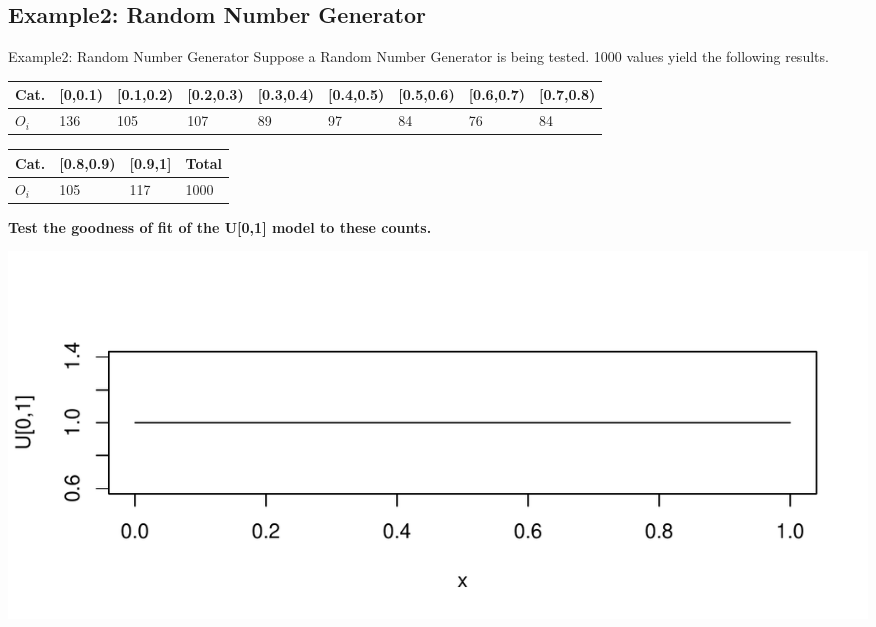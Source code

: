 \documentclass[t,xcolor=pdftex,dvipsnames,table]{beamer}
\makeatletter
\def\maxwidth{ %
  \ifdim\Gin@nat@width>\linewidth
    \linewidth
  \else
    \Gin@nat@width
  \fi
}
\newenvironment{knitrout}{}{} %
\makeatother
\begin{document}
\subsection[GoodnessofFit]{Example2: Random Number Generator}
\begin{frame}[fragile]{Example2: Random Number Generator}
Suppose a Random Number Generator is being tested. 1000 values yield the following results. \\

\vspace{.5cm}
{\tiny 
\begin{tabular}{l|llllllll}  \hline
Cat. & [0,0.1) &  [0.1,0.2) & [0.2,0.3) & [0.3,0.4) & [0.4,0.5) & [0.5,0.6) & [0.6,0.7) & [0.7,0.8)  \\ \hline
$O_{i}$ & 136 & 105 & 107 & 89 & 97 & 84 & 76 & 84    \\ \hline
\end{tabular}
}

\vspace{.5cm}
{\tiny 
\begin{tabular}{l|lll}  \hline
Cat. & [0.8,0.9) &  [0.9,1] & Total \\ \hline
$O_{i}$ & 105  & 117  & 1000      \\ \hline
\end{tabular}
}

\vspace{.5cm}
{\bf Test the goodness of fit of the U[0,1] model to these counts.}

\begin{knitrout}
\color{fgcolor}
\includegraphics[width=\maxwidth]{figure/unnamed-chunk-2-1} 

\end{knitrout}
\end{frame}
\end{document}
